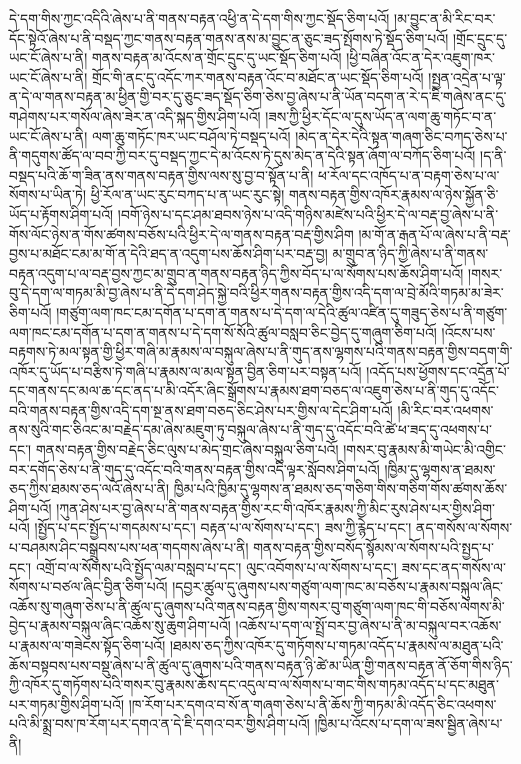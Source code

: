 དེ་དག་གིས་ཀྱང་འདིའི་ཞེས་པ་ནི་གནས་བརྟན་འཕྱི་ན་དེ་དག་གིས་ཀྱང་སྡོད་ཅིག་པའོ། །མ་བྱུང་ན་མི་རིང་བར་དོང་སྟེའོ་ཞེས་པ་ནི་བསྡད་ཀྱང་གནས་བརྟན་གནས་ནས་མ་བྱུང་ན་ཅུང་ཟད་སྤོགས་ཏེ་སྡོད་ཅིག་པའོ། །གྲོང་དྲུང་དུ་ཡང་ངོ་ཞེས་པ་ནི། གནས་བརྟན་མ་འོངས་ན་གྲོང་དྲུང་དུ་ཡང་སྡོད་ཅིག་པའོ། །ཕྱི་བཞིན་འོང་ན་དེར་འཇུག་ཁར་ཡང་ངོ་ཞེས་པ་ནི། གྲོང་གི་ནང་དུ་འདོང་ཀར་གནས་བརྟན་འོང་བ་མཐོང་ན་ཡང་སྡོད་ཅིག་པའོ། །སྤྱན་འདྲེན་པ་ལྟ་ན་དེ་ལ་གནས་བརྟན་མ་ཕྱིན་གྱི་བར་དུ་ཅུང་ཟད་སྡོད་ཅིག་ཅེས་བྱ་ཞེས་པ་ནི་ཡོན་བདག་ན་རེ་ད་ཇི་གཞེས་ནང་དུ་གཤེགས་པར་གསོལ་ཞེས་ཟེར་ན་འདི་སྐད་གྱིས་ཤིག་པའོ། །ཟས་ཀྱི་ཕྱིར་དོང་ལ་དུས་ཡོད་ན་ལག་ཆུ་གཏོང་བ་ན་ཡང་ངོ་ཞེས་པ་ནི། ལག་ཆུ་གཏོང་ཁར་ཡང་བཤོལ་ཏེ་བསྡད་པའོ། །མེད་ན་དེར་དེའི་སྟན་གཞག་ཅིང་བཀད་ཅེས་པ་ནི་གདུགས་ཚོད་ལ་བབ་ཀྱི་བར་དུ་བསྡད་ཀྱང་དེ་མ་འོངས་ཏེ་དུས་མེད་ན་དེའི་སྟན་ཞོག་ལ་བཀོད་ཅིག་པའོ། །ད་ནི་བསྡད་པའི་ཆོ་ག་ཟིན་ནས་གནས་བརྟན་གྱིས་ལས་སུ་བྱ་བ་སྟོན་པ་ནི། ཕ་རོལ་དང་འཁོད་པ་ན་བརྟག་ཅེས་པ་ལ་སོགས་པ་ཡིན་ཏེ། ཕྱི་རོལ་ན་ཡང་རུང་བཀད་པ་ན་ཡང་རུང་སྟེ། གནས་བརྟན་གྱིས་འཁོར་རྣམས་ལ་ཉེས་སྐྱོན་ཅི་ཡོད་པ་རྟོགས་ཤིག་པའོ། །བགོ་ཉེས་པ་དང་ཤམ་ཐབས་ཉེས་པ་འདི་གཉིས་མཛེས་པའི་ཕྱིར་དེ་ལ་བརྡ་བྱ་ཞེས་པ་ནི་གོས་ལོང་ཉེས་ན་གོས་ཚགས་བཅོས་པའི་ཕྱིར་དེ་ལ་གནས་བརྟན་བརྡ་གྱིས་ཤིག །མ་གོ་ན་རྒན་པོ་ལ་ཞེས་པ་ནི་བརྡ་བྱས་པ་མཐོང་ངམ་མ་གོ་ན་དེའི་ཐད་ན་འདུག་པས་ཆོས་ཤིག་པར་བརྡ་བྱ། མ་གྲུབ་ན་ཉིད་ཀྱི་ཞེས་པ་ནི་གནས་བརྟན་འདུག་པ་ལ་བརྡ་བྱས་ཀྱང་མ་གྲུབ་ན་གནས་བརྟན་ཉིད་ཀྱིས་བོད་པ་ལ་སོགས་པས་ཆོས་ཤིག་པའོ། །གསར་བུ་དེ་དག་ལ་གཏམ་མི་བྱ་ཞེས་པ་ནི་དེ་དག་ཤེད་སྐྱེ་བའི་ཕྱིར་གནས་བརྟན་གྱིས་འདི་དག་ལ་བྲེ་མོའི་གཏམ་མ་ཟེར་ཅིག་པའོ། །གཙུག་ལག་ཁང་ངམ་དགོན་པ་དག་ན་གནས་པ་དེ་དག་ལ་དེའི་ཚུལ་འཛིན་དུ་གཟུད་ཅེས་པ་ནི་གཙུག་ལག་ཁང་ངམ་དགོན་པ་དག་ན་གནས་པ་དེ་དག་སོ་སོའི་ཚུལ་བསླབ་ཅིང་བྱེད་དུ་གཞུག་ཅིག་པའོ། །འོངས་པས་བརྟགས་ཏེ་མལ་སྟན་གྱི་ཕྱིར་གཞི་མ་རྣམས་ལ་བསྐུལ་ཞེས་པ་ནི་གུད་ནས་ལྷགས་པའི་གནས་བརྟན་གྱིས་བདག་གི་འཁོར་དུ་ཡོད་པ་བརྩིས་ཏེ་གཞི་པ་རྣམས་ལ་མལ་སྟན་བྱིན་ཅིག་པར་བསྟན་པའོ། །འདོད་པས་ཕྱོགས་དང་འདྲོན་པོ་དང་གནས་དང་མལ་ཆ་དང་ནད་པ་མི་འདོར་ཞིང་སྒྲོགས་པ་རྣམས་ཐག་བཅད་ལ་འཇུག་ཅེས་པ་ནི་གུད་དུ་འདོང་བའི་གནས་བརྟན་གྱིས་འདི་དག་སྔ་ནས་ཐག་བཅད་ཅིང་ཤེས་པར་གྱིས་ལ་དེང་ཤིག་པའོ། །མི་རིང་བར་འཕགས་ནས་སུའི་གང་ཅིའང་མ་བརྗེད་དམ་ཞེས་མཇུག་ཏུ་བསྐུལ་ཞེས་པ་ནི་གུད་དུ་འདོང་བའི་ཚེ་ཕ་ཟད་དུ་འཕགས་པ་དང་། གནས་བརྟན་གྱིས་བརྗེད་ཅིང་ལུས་པ་མེད་གྲང་ཞེས་བསྐུལ་ཅིག་པའོ། །གསར་བུ་རྣམས་མི་གཡེང་མི་འགྱིང་བར་དགོད་ཅེས་པ་ནི་གུད་དུ་འདོང་བའི་གནས་བརྟན་གྱིས་འདི་ལྟར་སློབས་ཤིག་པའོ། །ཁྱིམ་དུ་ལྷགས་ན་ཐམས་ཅད་ཀྱིས་ཐམས་ཅད་ལའོ་ཞེས་པ་ནི། ཁྱིམ་པའི་ཁྱིམ་དུ་ལྷགས་ན་ཐམས་ཅད་གཅིག་གིས་གཅིག་གོས་ཚགས་ཆོས་ཤིག་པའོ། །ཀུན་ཤེས་པར་བྱ་ཞེས་པ་ནི་གནས་བརྟན་གྱིས་རང་གི་འཁོར་རྣམས་ཀྱི་མིང་རུས་ཤེས་པར་གྱིས་ཤིག་པའོ། །སྤྱོད་པ་དང་སྤྱོད་པ་གདམས་པ་དང་། བརྟན་པ་ལ་སོགས་པ་དང་། ཟས་ཀྱི་རྙེད་པ་དང་། ནད་གསོས་ལ་སོགས་པ་བཤམས་ཤིང་བསྒྲུབས་པས་ཕན་གདགས་ཞེས་པ་ནི། གནས་བརྟན་གྱིས་བསོད་སྙོམས་ལ་སོགས་པའི་སྤྱད་པ་དང་། འགྲོ་བ་ལ་སོགས་པའི་སྤྱོད་ལམ་བསླབ་པ་དང་། ལུང་འབོགས་པ་ལ་སོགས་པ་དང་། ཟས་དང་ནད་གསོས་ལ་སོགས་པ་བཙལ་ཞིང་བྱིན་ཅིག་པའོ། །དབྱར་ཚུལ་དུ་ཞུགས་པས་གཙུག་ལག་ཁང་མ་བཅོས་པ་རྣམས་བསྐུལ་ཞིང་འཆོས་སུ་གཞུག་ཅེས་པ་ནི་ཚུལ་དུ་ཞུགས་པའི་གནས་བརྟན་གྱིས་གསར་བུ་གཙུག་ལག་ཁང་གི་བཅོས་ལེགས་མི་བྱེད་པ་རྣམས་བསྐུལ་ཞིང་འཆོས་སུ་ཆུག་ཤིག་པའོ། །འཆོས་པ་དག་ལ་སྤྲོ་བར་བྱ་ཞེས་པ་ནི་མ་བསྐུལ་བར་འཆོས་པ་རྣམས་ལ་གཟེངས་སྟོད་ཅིག་པའོ། །ཐམས་ཅད་ཀྱིས་འཁོར་དུ་གཏོགས་པ་གཏམ་འདོད་པ་རྣམས་ལ་མཐུན་པའི་ཆོས་བསྟབས་པས་བསྡུ་ཞེས་པ་ནི་ཚུལ་དུ་ཞུགས་པའི་གནས་བརྟན་ཉི་ཚེ་མ་ཡིན་གྱི་གནས་བརྟན་ནོ་ཅོག་གིས་ཉིད་ཀྱི་འཁོར་དུ་གཏོགས་པའི་གསར་བུ་རྣམས་ཆོས་དང་འདུལ་བ་ལ་སོགས་པ་གང་གིས་གཏམ་འདོད་པ་དང་མཐུན་པར་གཏམ་གྱིས་ཤིག་པའོ། །ཁ་རོག་པར་དགའ་བ་སོ་ན་གཞག་ཅེས་པ་ནི་ཆོས་ཀྱི་གཏམ་མི་འདོད་ཅིང་འཕགས་པའི་མི་སྨྲ་བས་ཁ་རོག་པར་དགའ་ན་དེ་ཇི་དགའ་བར་གྱིས་ཤིག་པའོ། །ཁྱིམ་པ་འོངས་པ་དག་ལ་ཟས་སྦྱིན་ཞེས་པ་ནི། 